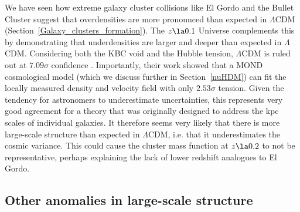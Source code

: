 \documentclass[fleqn,usenatbib,useAMS]{mnras} %
\begin{document}
We have seen how extreme galaxy cluster collisions like El Gordo and the Bullet Cluster suggest that overdensities are more pronounced than expected in $\Lambda$CDM (Section~\ref{Galaxy_clusters_formation}). The $z \la 0.1$ Universe complements this by demonstrating that underdensities are larger and deeper than expected in $\Lambda$CDM. Considering both the KBC void and the Hubble tension, $\Lambda$CDM is ruled out at $7.09\sigma$ confidence \citep{Haslbauer_2020}. Importantly, their work showed that a MOND cosmological model (which we discuss further in Section~\ref{nuHDM}) can fit the locally measured density and velocity field with only $2.53\sigma$ tension. Given the tendency for astronomers to underestimate uncertainties, this represents very good agreement for a theory that was originally designed to address the kpc scales of individual galaxies. It therefore seems very likely that there is more large-scale structure than expected in $\Lambda$CDM, i.e. that it underestimates the cosmic variance. This could cause the cluster mass function at $z \la 0.2$ to not be representative, perhaps explaining the lack of lower redshift analogues to El Gordo.



\subsection{Other anomalies in large-scale structure}
\label{Other_anomalies_LSS}
\end{document}
